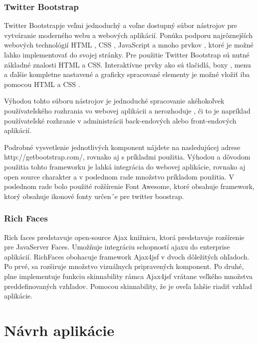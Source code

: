 \subsubsection{Twitter Bootstrap}
Twitter Bootstrapje veľmi jednoduchý a voľne dostupný súbor nástrojov pre vytváranie moderného webu a webových aplikácií.\cite{boot} Ponúka podporu najrôznejších webových technológií HTML , CSS , JavaScript a mnoho prvkov , ktoré je možné ľahko implementovať do svojej stránky. Pre použitie Twitter Bootstrap sú nutné základné znalosti HTML a CSS. Interaktívne prvky ako sú tlačidlá, boxy , menu a ďalšie kompletne nastavené a graficky spracované elementy je možné vložiť iba pomocou HTML a CSS .

Výhodou tohto súboru nástrojov je jednoduché spracovanie akéhokoľvek používateľského rozhrania vo webovej aplikácii a nerozhoduje , či to je napríklad používateľské rozhranie v administrácii back-endových alebo front-endových aplikácií.


Podrobné vysvetlenie jednotlivých komponent nájdete na nasledujúcej adrese http://getbootstrap.com/, rovnako aj s príkladmi použitia. Výhodou a dôvodom použitia tohto frameworku je lahká integrácia do webovej aplikácie, rovnako aj open source charakter a v poslednom rade množstvo príkladom použitia. V poslednom rade bolo použité rožšírenie Font Awesome, ktoré obsahuje framework, ktorý obsahuje ikonové fonty určen´e pre twitter boostrap.


\subsubsection{Rich Faces}
Rich faces predstavuje open-source Ajax knižnicu, ktorá predstavuje rozšírenie pre JavaServer Faces. Umožňuje integráciu schopností ajaxu do enterprise aplikácií. RichFaces obohacuje framework Ajax4jsf v dvoch dôležitých ohľadoch. Po prvé, sa rozširuje množstvo vizuálnych pripravených komponent. Po druhé,  plne implementuje funkciu skinnability rámca Ajax4jsf vrátane veľkého množstva preddefinovaných vzhľadov. Pomocou skinnability, že je oveľa ľahšie riadiť vzhľad aplikácie.





\section{Návrh aplikácie}






